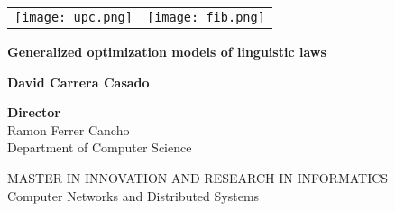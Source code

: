 \begin{titlepage}
  \tiny
  \vspace*{-3cm}
  \hspace*{-3cm}
  \begin{tabular}{lr}
    \texttt{[image: upc.png]} & \texttt{[image: fib.png]}  \\
  \end{tabular}
  \begin{center}
    \vspace{4cm}
    
    \Huge
    \textbf{Generalized optimization models of linguistic laws}
    
    \vspace{0.5cm}
    \LARGE
    
    \vspace{1.5cm}
    
    \textbf{David Carrera Casado}
    
    \vfill
    
    \Large
    \textbf{Director}\\
    Ramon Ferrer Cancho\\
    Department of Computer Science\\

    \vspace{0.5cm}
    
    \coverdatefmt{}
    
    \vspace{1.5cm}

    \normalsize
    MASTER IN INNOVATION AND RESEARCH IN INFORMATICS\\
    Computer Networks and Distributed Systems
  \end{center}
\end{titlepage}

